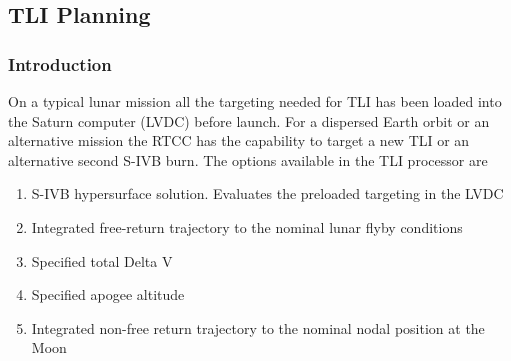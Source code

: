 \documentclass[11pt]{article} %
\begin{document}
\subsection{TLI Planning}
\subsubsection{Introduction}
On a typical lunar mission all the targeting needed for TLI has been loaded into the Saturn computer (LVDC) before launch. For a dispersed Earth orbit or an alternative mission the RTCC has the capability to target a new TLI or an alternative second S-IVB burn. The options available in the TLI processor are

\begin{enumerate}
	\item S-IVB hypersurface solution. Evaluates the preloaded targeting in the LVDC
	\item Integrated free-return trajectory to the nominal lunar flyby conditions
	\item Specified total Delta V
	\item Specified apogee altitude
	\item Integrated non-free return trajectory to the nominal nodal position at the Moon
\end{enumerate}
\end{document}
